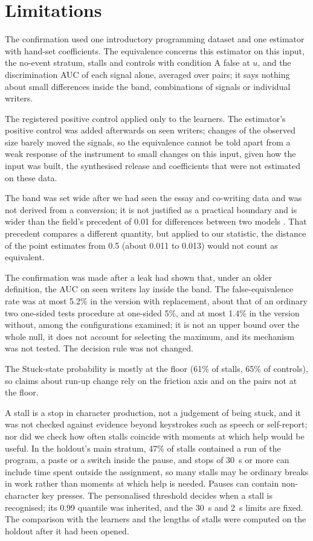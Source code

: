 \section{Limitations}
\label{sec:limitations}

The confirmation used one introductory programming dataset and one estimator with hand-set coefficients. The
equivalence concerns this estimator on this input, the no-event stratum, stalls and controls with condition A false at
$u$, and the discrimination AUC of each signal alone, averaged over pairs; it says nothing about small differences inside
the band, combinations of signals or individual writers.

The registered positive control applied only to the learners. The estimator's positive control was added afterwards on
seen writers; changes of the observed size barely moved the signals, so the equivalence cannot be told apart from a weak
response of the instrument to small changes on this input, given how the input was built, the synthesised release and
coefficients that were not estimated on these data.

The band was set wide after we had seen the essay and co-writing data and was not derived from a conversion;
it is not justified as a practical boundary and is wider than the field's precedent of 0.01 for differences between two
models \cite{gardner2018evaluating}. That precedent compares a different quantity, but applied to our statistic, the
distance of the point estimates from 0.5 (about 0.011 to 0.013) would not count as equivalent.

The confirmation was made after a leak had shown that, under an older definition, the AUC on seen writers lay inside the band. The false-equivalence rate was at most 5.2\% in
the version with replacement, about that of an ordinary two one-sided tests procedure at one-sided 5\%, and at most 1.4\%
in the version without, among the configurations examined; it is not an
upper bound over the whole null, it does not account for selecting the maximum, and its mechanism was not tested. The
decision rule was not changed.

The Stuck-state probability is mostly at the floor (61\% of stalls, 65\% of controls), so claims about run-up change
rely on the friction axis and on the pairs not at the floor.

A stall is a stop in character production, not a judgement of being stuck, and it was not checked against evidence
beyond keystrokes such as speech or self-report; nor did we check how often stalls coincide with moments at which help
would be useful. In the holdout's main stratum, 47\% of stalls contained a run of the program, a paste or a switch
inside the pause, and stops of 30~s or more can include time spent outside the assignment, so many stalls may be ordinary
breaks in work rather than moments at which help is needed. Pauses can contain non-character key presses. The personalised threshold decides when a stall is
recognised; its 0.99 quantile was inherited, and the 30~s and 2~s limits are fixed. The comparison with the learners and
the lengths of stalls were computed on the holdout after it had been opened.

